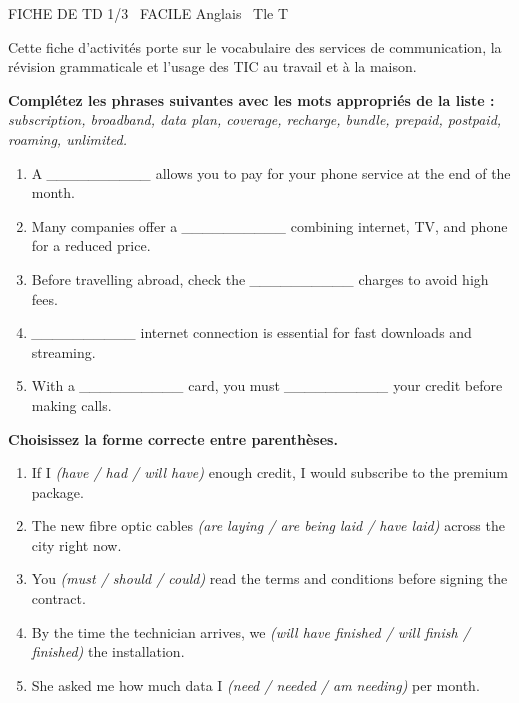\documentclass[11pt]{article}
\begin{document}
\begin{tcolorbox}[enhanced,colback=popink,colframe=popink,arc=10pt,boxrule=0pt,left=12pt,right=12pt,top=9pt,bottom=9pt]
{\color{white}\popxbold\small FICHE DE TD 1/3 \textbullet\ FACILE \hfill Anglais \textbullet\ Tle T\par}
\end{tcolorbox}
\vspace{4pt}
Cette fiche d'activités porte sur le vocabulaire des services de communication, la révision grammaticale et l'usage des TIC au travail et à la maison.

\begin{exercice}
\textbf{Complétez les phrases suivantes avec les mots appropriés de la liste :} \textit{subscription, broadband, data plan, coverage, recharge, bundle, prepaid, postpaid, roaming, unlimited.}
\begin{enumerate}
    \item A \textit{\_\_\_\_\_\_\_\_\_\_} allows you to pay for your phone service at the end of the month.
    \item Many companies offer a \textit{\_\_\_\_\_\_\_\_\_\_} combining internet, TV, and phone for a reduced price.
    \item Before travelling abroad, check the \textit{\_\_\_\_\_\_\_\_\_\_} charges to avoid high fees.
    \item \textit{\_\_\_\_\_\_\_\_\_\_} internet connection is essential for fast downloads and streaming.
    \item With a \textit{\_\_\_\_\_\_\_\_\_\_} card, you must \textit{\_\_\_\_\_\_\_\_\_\_} your credit before making calls.
\end{enumerate}
\end{exercice}

\begin{exercice}
\textbf{Choisissez la forme correcte entre parenthèses.}
\begin{enumerate}
    \item If I \textit{(have / had / will have)} enough credit, I would subscribe to the premium package.
    \item The new fibre optic cables \textit{(are laying / are being laid / have laid)} across the city right now.
    \item You \textit{(must / should / could)} read the terms and conditions before signing the contract.
    \item By the time the technician arrives, we \textit{(will have finished / will finish / finished)} the installation.
    \item She asked me how much data I \textit{(need / needed / am needing)} per month.
\end{enumerate}
\end{exercice}
\end{document}
